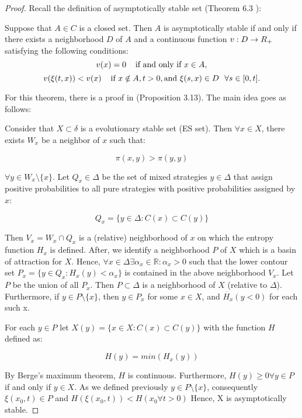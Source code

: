 \documentclass[a4 paper, 12pt]{article}
\begin{document}
\begin{proof}

Recall the definition of asymptotically stable set (Theorem 6.3 \cite{b2}):
\begin{defi}
        Suppose that $A \in C$ is a closed set. Then $A$ is asymptotically stable if and only if there exists a neighborhood $D$ of $A$ and a continuous function $v:D\rightarrow R_+$ satisfying the following conditions:
        \begin{equation}
                v(x) = 0 \hspace{0.4cm} \textnormal{if and only if } x\in A,
        \end{equation}
        \begin{equation}
                v(\xi(t,x)) < v(x) \hspace{0.4cm} \textnormal{if } x\notin A, t>0, \textnormal{and } \xi(s,x)\in D ~~\forall s\in[0,t].
        \end{equation}
\end{defi}

For this theorem, there is a proof in \cite{b2} (Proposition 3.13). The main idea goes as follows:
        
Consider that $X \subset \delta$ is a evolutionary stable set (ES set). Then $\forall x \in X$, there exists $W_x$ be a neighbor of $x$ such that:

\begin{equation}
\pi(x,y) > \pi(y,y)
\end{equation}

$\forall y \in W_x \setminus\{x\}$. Let $Q_x \in \Delta$ be the set of mixed strategies $y \in \Delta$ that assign positive probabilities to all pure strategies with positive probabilities assigned by $x$:

\begin{equation}
Q_x=\{y \in \Delta : C(x) \subset C(y)\}
\end{equation}

Then $V_x=W_x \cap Q_x $  is a (relative) neighborhood of $x$ on which the entropy function $H_x$ is defined. After, we identify a neighborhood $P$ of $X$ which is a basin of attraction for $X$. Hence, $\forall x \in \Delta \exists \alpha_x \in \mathbb{R} : \alpha_x > 0$ such that the lower contour set $P_x=\{y \in Q_x : H_x(y) < \alpha_x\}$ is contained in the above neighborhood $V_x$. Let $P$ be the union of all $P_x$. Then $P \subset \Delta$ is a neighborhood of $X$ (relative to $\Delta$). Furthermore, if $y \in P\setminus\{x\} $, then $y \in P_x$ for some $x \in X$, and $\dot{H_x}(y<0)$ for each such x.

For each $y \in P$ let $X(y)=\{x \in X : C(x) \subset C(y) \}$ with the function $H$ defined as:

\begin{equation}
H(y)=min(H_x(y))
\end{equation}

By Berge's maximum theorem, $H$ is continuous. Furthermore, $H(y) \ge 0 \forall y \in P$ if and only if $y \in X$. As we defined previously  $y \in P\setminus\{x\} $, consequently $\xi(x_0,t)\in P$ and $H(\xi(x_0,t))<H(x_0 \forall t > 0)$ Hence, X is asymptotically stable.


\end{proof}
\end{document}
